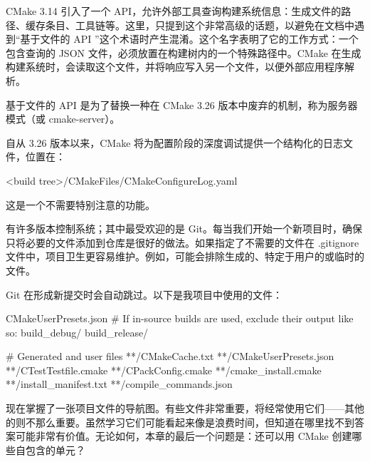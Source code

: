 CMake 3.14 引入了一个 API，允许外部工具查询构建系统信息：生成文件的路径、缓存条目、工具链等。这里，只提到这个非常高级的话题，以避免在文档中遇到“基于文件的 API ”这个术语时产生混淆。这个名字表明了它的工作方式：一个包含查询的 JSON 文件，必须放置在构建树内的一个特殊路径中。CMake 在生成构建系统时，会读取这个文件，并将响应写入另一个文件，以便外部应用程序解析。

基于文件的 API 是为了替换一种在 CMake 3.26 版本中废弃的机制，称为服务器模式（或 cmake-server）。


自从 3.26 版本以来，CMake 将为配置阶段的深度调试提供一个结构化的日志文件，位置在：

\begin{shell}
<build tree>/CMakeFiles/CMakeConfigureLog.yaml
\end{shell}

这是一个不需要特别注意的功能。


有许多版本控制系统；其中最受欢迎的是 Git。每当我们开始一个新项目时，确保只将必要的文件添加到仓库是很好的做法。如果指定了不需要的文件在 .gitignore 文件中，项目卫生更容易维护。例如，可能会排除生成的、特定于用户的或临时的文件。

Git 在形成新提交时会自动跳过。以下是我项目中使用的文件：


\begin{shell}
CMakeUserPresets.json
# If in-source builds are used, exclude their output like so:
build_debug/
build_release/

# Generated and user files
**/CMakeCache.txt
**/CMakeUserPresets.json
**/CTestTestfile.cmake
**/CPackConfig.cmake
**/cmake_install.cmake
**/install_manifest.txt
**/compile_commands.json
\end{shell}

现在掌握了一张项目文件的导航图。有些文件非常重要，将经常使用它们——其他的则不那么重要。虽然学习它们可能看起来像是浪费时间，但知道在哪里找不到答案可能非常有价值。无论如何，本章的最后一个问题是：还可以用 CMake 创建哪些自包含的单元？





























